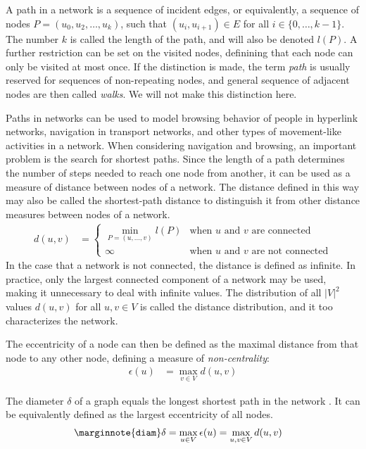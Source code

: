 \documentclass{article}
\begin{document}
A path in a network is a sequence of incident edges, or equivalently, a
sequence of nodes $P = (u_0, u_2, \dotsc, u_k)$, such that $(u_i,
u_{i+1})\in E$ for all $i \in \{0, \dotsc, k-1\}$.  The number $k$ is
called the length of the path, and will also be denoted $l(P)$.  A
further restriction can be set on the visited nodes, definining that
each node can only be visited at most once. If the distinction is made,
the term \emph{path} is usually reserved for sequences of non-repeating
nodes, and general sequence of adjacent nodes are then called
\emph{walks}.  We will not make this distinction here.

Paths in networks can be used to model browsing behavior of people in
hyperlink networks, navigation in transport networks, and other types of
movement-like activities in a network.  When considering navigation and
browsing, an important problem is the search for shortest paths.  Since
the length of a path determines the number of steps needed to reach one
node from another, it can be used as a measure of distance between nodes
of a network.  The distance defined in this way may also be called the
shortest-path distance to distinguish it from other distance measures
between nodes of a network.
\begin{align}
  d(u, v) &= \left\{ \begin{array} {ll} \min_{P=(u, \dotsc, v)} l(P) &
    \text{when $u$ and $v$ are connected} \\ \infty & \text{when $u$ and
      $v$ are not connected}
  \end{array} \right. 
\end{align}
In the case that a network is not connected, the distance is defined as
infinite.  In practice, only the largest connected component of a
network may be used, making it unnecessary to deal with infinite values.
The distribution of all $|V|^2$ values $d(u,v)$ for all $u,v\in V$ is
called the distance distribution, and it too characterizes the network.

The eccentricity of a node can then be defined as the maximal distance
from that node to any other node, defining a measure of
\emph{non-centrality}:
\begin{align}
  \epsilon(u) &= \max_{v\in V} d(u,v)
\end{align}

The diameter $\delta$ of a graph equals the longest shortest path in the
network \cite{b779}.  It can be equivalently defined as the largest eccentricity of
all nodes.
\begin{align}
  \marginnote{\texttt{diam}} \delta &= \max_{u \in V} \epsilon(u) =
  \max_{u,v \in V} d(u,v)
\end{align}
\end{document}
